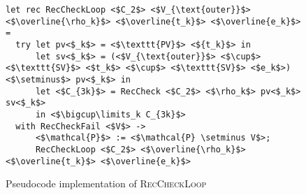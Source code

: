 \begin{figure}
\centering

\begin{verbatim}
let rec RecCheckLoop <$C_2$> <$V_{\text{outer}}$> <$\overline{\rho_k}$> <$\overline{t_k}$> <$\overline{e_k}$> =
  try let pv<$_k$> = <$\texttt{PV}$> <${t_k}$> in
      let sv<$_k$> = (<$V_{\text{outer}}$> <$\cup$> <$\texttt{SV}$> <$t_k$> <$\cup$> <$\texttt{SV}$> <$e_k$>) <$\setminus$> pv<$_k$> in
      let <$C_{3k}$> = RecCheck <$C_2$> <$\rho_k$> pv<$_k$> sv<$_k$>
      in <$\bigcup\limits_k C_{3k}$>
  with RecCheckFail <$V$> ->
      <$\mathcal{P}$> := <$\mathcal{P} \setminus V$>;
      RecCheckLoop <$C_2$> <$\overline{\rho_k}$> <$\overline{t_k}$> <$\overline{e_k}$>
\end{verbatim}

\caption{Pseudocode implementation of \textsc{RecCheckLoop}}
\label{fig:helpers}
\end{figure}